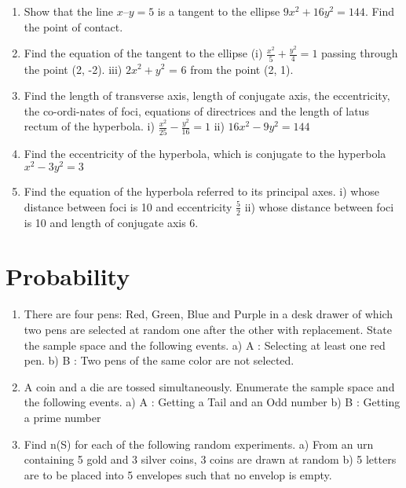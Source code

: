 \documentclass[14pt]{article}
\begin{document}
\begin{multicols}{2}
\begin{enumerate}[resume]
\item Show that the line $x – y = 5$ is a tangent to the ellipse $9x^2 + 16y^2 = 144$. Find the point of contact.

\item Find the equation of the tangent to the ellipse (i) $\frac{x^2}{5} + \frac{y^2}{4} = 1$ passing through the point (2, -2). iii) $2x^2 + y^2$ = 6 from the point (2, 1).

\item Find the length of transverse axis, length of conjugate axis, the eccentricity, the co-ordi-nates of foci, equations of directrices and the
length of latus rectum of the hyperbola. i) $\frac{x^2}{25}-\frac{y^2}{16} = 1$ ii) $16x^2 - 9y^2 = 144$

\item Find the eccentricity of the hyperbola, which is conjugate to the hyperbola $x^2 - 3y^2 = 3$

\item Find the equation of the hyperbola referred to its principal axes. i) whose distance between foci is 10 and eccentricity $\frac{5}{2}$
ii) whose distance between foci is 10 and length of conjugate axis 6.

\end{enumerate} 





\section{Probability}
\noindent
\begin{enumerate}[resume]
 \item There are four pens: Red, Green, Blue and
Purple in a desk drawer of which two pens
are selected at random one after the other
with replacement. State the sample space
and the following events. a)	 A : Selecting at least one red pen. b)	 B : Two pens of the same color are not
selected.

\item A coin and a die are tossed simultaneously.
Enumerate the sample space and the
following events. a)	 A : Getting a Tail and an Odd number b)	 B : Getting a prime number
	
\item	 Find n(S) for each of the following random
experiments.  a) From an urn containing 5 gold and 3
silver coins, 3 coins are drawn at random b)	 5 letters are to be placed into 5 envelopes
such that no envelop is empty.


\end{enumerate}
\end{multicols}
\end{document}
